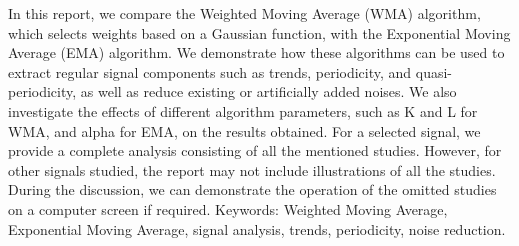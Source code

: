 In this report, we compare the Weighted Moving Average (WMA) algorithm, which selects weights based on a Gaussian function, with the Exponential Moving Average (EMA) algorithm. We demonstrate how these algorithms can be used to extract regular signal components such as trends, periodicity, and quasi-periodicity, as well as reduce existing or artificially added noises. We also investigate the effects of different algorithm parameters, such as K and L for WMA, and alpha for EMA, on the results obtained.
For a selected signal, we provide a complete analysis consisting of all the mentioned studies. However, for other signals studied, the report may not include illustrations of all the studies. During the discussion, we can demonstrate the operation of the omitted studies on a computer screen if required.
Keywords: Weighted Moving Average, Exponential Moving Average, signal analysis, trends, periodicity, noise reduction.
